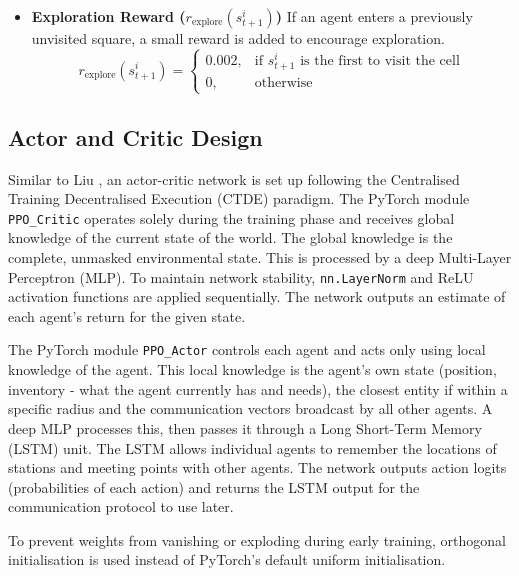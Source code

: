 \begin{itemize}
    \item \textbf{Exploration Reward ($r_{\text{explore}}(s_{t+1}^i)$)}
    If an agent enters a previously unvisited square, a small reward is added to encourage exploration.
    \begin{equation}
        r_{\text{explore}}(s_{t+1}^i) =
        \begin{cases}
            0.002, & \text{if $s_{t+1}^i$ is the first to visit the cell} \\
            0, & \text{otherwise}
        \end{cases}
    \end{equation}
\end{itemize}

\subsection{Actor and Critic Design}
\label{sec:3.3.2}

Similar to Liu \cite{AIMotherTongue}, an actor-critic network is set up following the Centralised Training Decentralised Execution (CTDE) paradigm.
The PyTorch module \lstinline[language=Python]|PPO_Critic| operates solely during the training phase and receives global knowledge of the current state of the world.
The global knowledge is the complete, unmasked environmental state.
This is processed by a deep Multi-Layer Perceptron (MLP).
To maintain network stability, \lstinline[language=Python]|nn.LayerNorm| and ReLU activation functions are applied sequentially.
The network outputs an estimate of each agent's return for the given state.

The PyTorch module \lstinline[language=Python]|PPO_Actor| controls each agent and acts only using local knowledge of the agent.
This local knowledge is the agent's own state (position, inventory - what the agent currently has and needs), the closest entity if within a specific radius and the communication vectors broadcast by all other agents.
A deep MLP processes this, then passes it through a Long Short-Term Memory (LSTM) unit.
The LSTM allows individual agents to remember the locations of stations and meeting points with other agents.
The network outputs action logits (probabilities of each action) and returns the LSTM output for the communication protocol to use later.

To prevent weights from vanishing or exploding during early training, orthogonal initialisation is used instead of PyTorch's default uniform initialisation.

